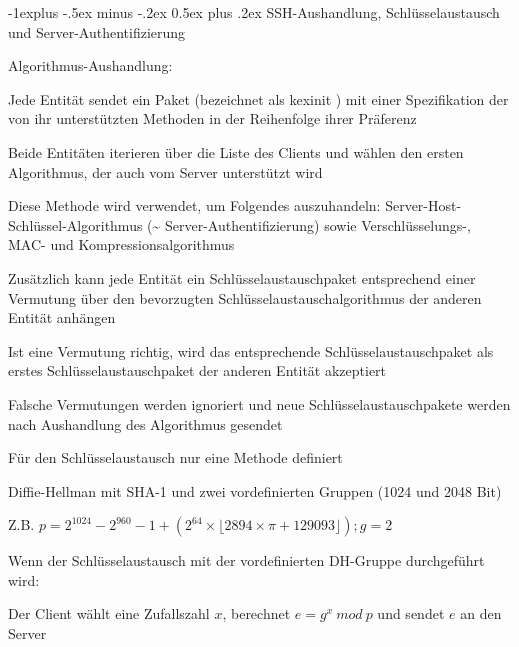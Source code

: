 \documentclass[a4paper]{article}
\makeatletter
\renewcommand{\subsection}{\@startsection{subsection}{2}{0mm}%
 {-1explus -.5ex minus -.2ex}%
 {0.5ex plus .2ex}%
 {\normalfont\normalsize\bfseries}}
\makeatother
\begin{document}
\begin{multicols}{3}
      \subsection{SSH-Aushandlung, Schlüsselaustausch und Server-Authentifizierung}
      \begin{itemize*}
            \item Algorithmus-Aushandlung:
            \begin{itemize*}
                  \item Jede Entität sendet ein Paket (bezeichnet als kexinit ) mit einer Spezifikation der von ihr unterstützten Methoden in der Reihenfolge ihrer Präferenz
                  \item Beide Entitäten iterieren über die Liste des Clients und wählen den ersten Algorithmus, der auch vom Server unterstützt wird
                  \item Diese Methode wird verwendet, um Folgendes auszuhandeln: Server-Host-Schlüssel-Algorithmus (\textasciitilde{} Server-Authentifizierung) sowie Verschlüsselungs-, MAC- und Kompressionsalgorithmus
                  \item Zusätzlich kann jede Entität ein Schlüsselaustauschpaket entsprechend einer Vermutung über den bevorzugten Schlüsselaustauschalgorithmus der anderen Entität anhängen
                  \item Ist eine Vermutung richtig, wird das entsprechende Schlüsselaustauschpaket als erstes Schlüsselaustauschpaket der anderen Entität akzeptiert
                  \item Falsche Vermutungen werden ignoriert und neue Schlüsselaustauschpakete werden nach Aushandlung des Algorithmus gesendet
            \end{itemize*}
            \item Für den Schlüsselaustausch nur eine Methode definiert
            \begin{itemize*}
                  \item Diffie-Hellman mit SHA-1 und zwei vordefinierten Gruppen (1024 und 2048 Bit)
                  \item Z.B. $p = 2^{1024} -2^{960} - 1 + (2^{64}\times \lfloor 2894 \times \pi + 129093\rfloor); g = 2$
            \end{itemize*}
            \item Wenn der Schlüsselaustausch mit der vordefinierten DH-Gruppe durchgeführt wird:
            \begin{itemize*}
                  \item Der Client wählt eine Zufallszahl $x$, berechnet $e=g^x\ mod\ p$ und sendet $e$ an den Server

\end{itemize*}
\end{itemize*}
\end{multicols}
\end{document}
